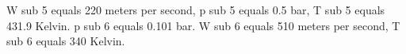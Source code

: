 W sub 5 equals 220 meters per second, p sub 5 equals 0.5 bar, T sub 5 equals 431.9 Kelvin. p sub 6 equals 0.101 bar. W sub 6 equals 510 meters per second, T sub 6 equals 340 Kelvin.